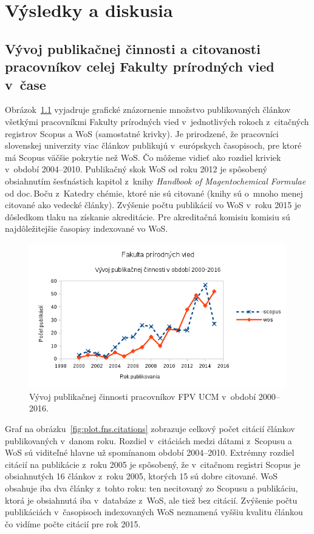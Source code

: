 \chapter{Výsledky a diskusia}

\section{Vývoj publikačnej činnosti a citovanosti pracovníkov celej Fakulty
  prírodných vied v~čase}

Obrázok~\ref{fig:plot.fns.publications} vyjadruje grafické znázornenie množstvo
publikovaných článkov všetkými pracovníkmi Fakulty prírodných vied
v~jednotlivých rokoch z~citačných registrov Scopus a WoS (samostatné krivky).  Je
prirodzené, že pracovníci slovenskej univerzity viac článkov publikujú
v~európskych časopisoch, pre ktoré má Scopus väčšie pokrytie než WoS.  Čo môžeme
vidieť ako rozdiel kriviek v~období 2004--2010.  Publikačný skok WoS od roku
2012 je spôsobený obsiahnutím šesťnástich kapitol z~knihy \emph{Handbook of
  Magentochemical Formulae} od doc.\,Boču z~Katedry chémie, ktoré nie sú
citované (knihy sú o~mnoho menej citované ako vedecké články).  Zvýšenie počtu
publikácií vo WoS v~roku 2015 je dôsledkom tlaku na získanie akreditácie.  Pre
akreditačná komisiu komisiu sú najdôležitejšie časopisy indexované vo WoS.

\begin{figure}
  \centering
  \includegraphics[width=\textwidth]{obr/plot-fns-publications.png}
  \caption{Vývoj publikačnej činnosti pracovníkov FPV UCM v~období 2000--2016.}
  \label{fig:plot.fns.publications}
\end{figure}

Graf na obrázku~\ref{fig:plot.fns.citations} zobrazuje celkový počet citácií
článkov publikovaných v~danom roku.  Rozdiel v~citáciách medzi dátami z~Scopusu
a WoS sú viditeľné hlavne už spomínanom období 2004--2010.  Extrémny rozdiel
citácií na publikácie z~roku 2005 je spôsobený, že v~citačnom registri Scopus je
obsiahnutých 16 článkov z~roku 2005, ktorých 15 sú dobre citované.  WoS obsahuje
iba dva články z~tohto roku: ten necitovaný zo Scopusu a publikáciu, ktorá je
obsiahnutá iba v~databáze z~WoS, ale tiež bez citácií.  Zvýšenie počtu
publikáciách v~časopisoch indexovaných WoS neznamená vyššiu kvalitu článkou čo
vidíme počte citácií pre rok 2015.

